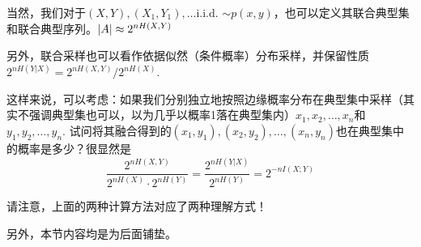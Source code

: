 当然，我们对于$(X,Y), (X_1,Y_1),\dots $i.i.d. $\sim p(x,y)$，也可以定义其联合典型集和联合典型序列。$\left\vert A\right\vert \approx 2^{nH(X,Y)}$

另外，联合采样也可以看作依据似然（条件概率）分布采样，并保留性质$2^{nH(Y|X)} = 2^{nH(X,Y)} / 2^{nH(X)}$. 

这样来说，可以考虑：如果我们分别独立地按照边缘概率分布在典型集中采样（其实不强调典型集也可以，以为几乎以概率1落在典型集内）$x_1,x_2,\dots, x_n$和$y_1,y_2,\dots, y_n$. 试问将其融合得到的$(x_1,y_1), (x_2,y_2),\dots,(x_n,y_n)$也在典型集中的概率是多少？很显然是 
\[
\dfrac{2^{n H(X,Y)}}{2^{n H(X)}\cdot 2^{nH(Y)}} = \dfrac{2^{nH(Y|X)}}{2^{nH(Y)}} = 2^{-nI(X;Y)}
\]

请注意，上面的两种计算方法对应了两种理解方式！

\bigskip
另外，本节内容均是为后面铺垫。

